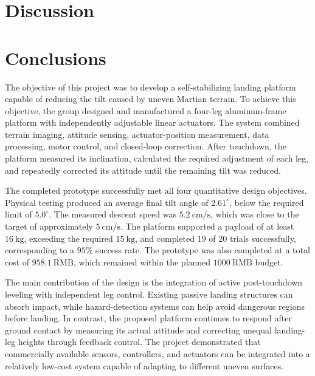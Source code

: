 \documentclass{engr1000j-s2}
\begin{document}
\newpage

\section{Discussion}






\newpage

\section{Conclusions}
\label{sec:conclusions}

The objective of this project was to develop a self-stabilizing landing platform capable of reducing the tilt caused by uneven Martian terrain. To achieve this objective, the group designed and manufactured a four-leg aluminum-frame platform with independently adjustable linear actuators. The system combined terrain imaging, attitude sensing, actuator-position measurement, data processing, motor control, and closed-loop correction. After touchdown, the platform measured its inclination, calculated the required adjustment of each leg, and repeatedly corrected its attitude until the remaining tilt was reduced.

The completed prototype successfully met all four quantitative design objectives. Physical testing produced an average final tilt angle of \(2.61^\circ\), below the required limit of \(5.0^\circ\). The measured descent speed was \(5.2~\mathrm{cm/s}\), which was close to the target of approximately \(5~\mathrm{cm/s}\). The platform supported a payload of at least \(16~\mathrm{kg}\), exceeding the required \(15~\mathrm{kg}\), and completed 19 of 20 trials successfully, corresponding to a \(95\%\) success rate. The prototype was also completed at a total cost of \(958.1~\mathrm{RMB}\), which remained within the planned \(1000~\mathrm{RMB}\) budget.

The main contribution of the design is the integration of active post-touchdown leveling with independent leg control. Existing passive landing structures can absorb impact, while hazard-detection systems can help avoid dangerous regions before landing. In contrast, the proposed platform continues to respond after ground contact by measuring its actual attitude and correcting unequal landing-leg heights through feedback control. The project demonstrated that commercially available sensors, controllers, and actuators can be integrated into a relatively low-cost system capable of adapting to different uneven surfaces.
\end{document}
